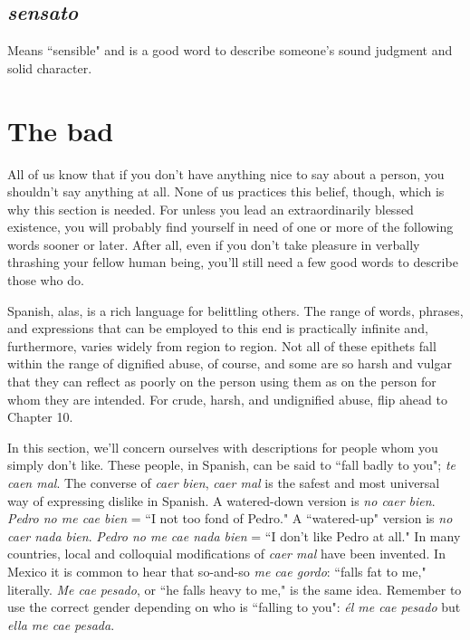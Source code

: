 \subsection{\emph{sensato}}

Means ``sensible" and is a good word to describe
someone's sound judgment and solid character.

\section{The bad}

All of us know that if you don't have anything nice to say
about a person, you shouldn't say anything at all. None of us practices
this belief, though, which is why this section is needed. For unless you
lead an extraordinarily blessed existence, you will probably find yourself in need of one or more of the following words sooner or later. After
all, even if you don't take pleasure in verbally thrashing your fellow
human being, you'll still need a few good words to describe those
who do.

Spanish, alas, is a rich language for belittling others. The range
of words, phrases, and expressions that can be employed to this end is
practically infinite and, furthermore, varies widely from region to region. Not all of these epithets fall within the range of dignified abuse,
of course, and some are so harsh and vulgar that they can reflect as
poorly on the person using them as on the person for whom they are
intended. For crude, harsh, and undignified abuse, flip ahead to
Chapter 10.

In this section, we'll concern ourselves with descriptions for
people whom you simply don't like. These people, in Spanish, can be
said to ``fall badly to you"; \emph{te caen mal}. The converse of \emph{caer bien},
\emph{caer mal} is the safest and most universal way of expressing dislike in
Spanish. A watered-down version is \emph{no caer bien}. \emph{Pedro no me cae
	bien} = ``I not too fond of Pedro." A ``watered-up" version is \emph{no caer
	nada bien}. \emph{Pedro no me cae nada bien} = ``I don't like Pedro at all." In
many countries, local and colloquial modifications of \emph{caer mal} have
been invented. In Mexico it is common to hear that so-and-so \emph{me cae
	gordo}: ``falls fat to me," literally. \emph{Me cae pesado}, or ``he falls heavy to
me," is the same idea. Remember to use the correct gender depending
on who is ``falling to you": \emph{él me cae pesado} but \emph{ella me cae pesada}.

